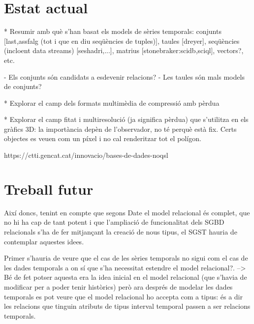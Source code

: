 




\section{Estat actual}

* Resumir amb què s'han basat els models de sèries temporals: conjunts [last,assfalg (tot i que en diu seqüències de tuples)], taules [dreyer], seqüències (incloent data streams) [seshadri,...], matrius [stonebraker:scidb,sciql],  vectors?, etc.
 
  - Els conjunts són candidats a esdevenir relacions?
  - Les taules són mals models de conjunts?



* Explorar el camp dels formats multimèdia de compressió amb pèrdua

* Explorar el camp fitat i multiresolució (ja significa pèrdua) que s'utilitza en els gràfics 3D: la importància depèn de l'observador, no té perquè està fix. Certs objectes es veuen com un píxel i no cal renderitzar tot el polígon.





https://ctti.gencat.cat/innovacio/bases-de-dades-noqsl


\section{Treball futur}




Així doncs, tenint en compte que segons Date el model relacional és complet, que no hi ha cap de tant potent i que l'ampliació de funcionalitat dels SGBD relacionals s'ha de fer mitjançant la creació de nous tipus, el SGST hauria de contemplar aquestes idees. 

Primer s'hauria de veure que el cas de les sèries temporals no sigui com el cas de les dades temporals a on sí que s'ha necessitat estendre el model relacional?. --> Bé de fet potser aquesta era la idea inicial en el model relacional (que s'havia de modificar per a poder tenir històrics) però ara després de modelar les dades temporals es pot veure que el model relacional ho accepta com a tipus: és a dir les relacions que tinguin atributs de tipus interval temporal passen a ser relacions temporals.

